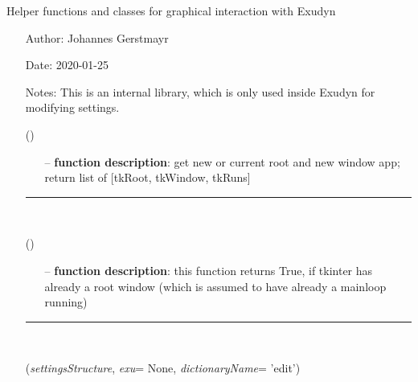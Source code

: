 \begin{itemize}[leftmargin=1.4cm]
\begin{itemize}[leftmargin=1.4cm]
\begin{itemize}[leftmargin=1.4cm]
\begin{itemize}[leftmargin=0.5cm]
\begin{itemize}[leftmargin=1.4cm]
\begin{itemize}[leftmargin=1.4cm]
\begin{itemize}[leftmargin=0.5cm]
\begin{itemize}[leftmargin=1.4cm]
\begin{itemize}[leftmargin=1.4cm]
\begin{itemize}[leftmargin=0.5cm]
%
\label{sec:module:GUI}
  Helper functions and classes for graphical interaction with Exudyn
\begin{itemize}[leftmargin=1.4cm]
\setlength{\itemindent}{-1.4cm}
\item[]Author:    Johannes Gerstmayr
\item[]Date:      2020-01-25
\item[]Notes:     This is an internal library, which is only used inside Exudyn for modifying settings.
\ei
\begin{flushleft}
\label{sec:GUI:GetTkRootAndNewWindow}
()
\end{flushleft}
\setlength{\itemindent}{0.7cm}
\begin{itemize}[leftmargin=0.7cm]
\item[--]
{\bf function description}: get new or current root and new window app; return list of [tkRoot, tkWindow, tkRuns]
\vspace{12pt}\end{itemize}
%
\noindent\rule{8cm}{0.75pt}\vspace{1pt} \\ 
\begin{flushleft}
\label{sec:GUI:TkRootExists}
()
\end{flushleft}
\setlength{\itemindent}{0.7cm}
\begin{itemize}[leftmargin=0.7cm]
\item[--]
{\bf function description}: this function returns True, if tkinter has already a root window (which is assumed to have already a mainloop running)
\vspace{12pt}\end{itemize}
%
\noindent\rule{8cm}{0.75pt}\vspace{1pt} \\ 
\begin{flushleft}
\label{sec:GUI:EditDictionaryWithTypeInfo}
({\it settingsStructure}, {\it exu}= None, {\it dictionaryName}= 'edit')
\end{flushleft}
\setlength{\itemindent}{0.7cm}
\begin{itemize}[leftmargin=0.7cm]

\end{itemize}
\end{itemize}
\end{itemize}
\end{itemize}
\end{itemize}
\end{itemize}
\end{itemize}
\end{itemize}
\end{itemize}
\end{itemize}
\end{itemize}
\end{itemize}
